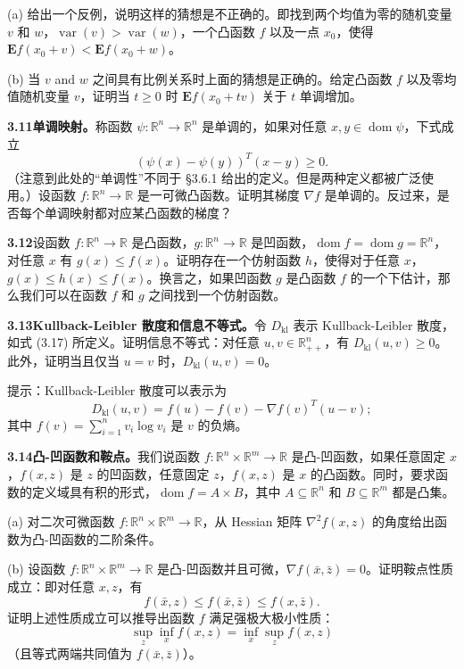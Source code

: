 \documentclass[UTF8, 12pt, fontset=fandol, oneside]{ctexart}
\DeclareMathOperator{\dom}{dom}
\begin{document}
(a) 给出一个反例，说明这样的猜想是不正确的。即找到两个均值为零的随机变量 $v$ 和 $w$，$\operatorname{var}(v)>\operatorname{var}(w)$，一个凸函数 $f$ 以及一点 $x_0$，使得 $\mathbf{E}f(x_0+v)<\mathbf{E}f(x_0+w)$。

(b) 当 $v$ and $w$ 之间具有比例关系时上面的猜想是正确的。给定凸函数 $f$ 以及零均值随机变量 $v$，证明当 $t\geq0$ 时 $\mathbf{E}f(x_0+tv)$ 关于 $t$ 单调增加。

\noindent\textbf{3.11\quad 单调映射。}\quad 称函数 $\psi:\mathbb{R}^n\to\mathbb{R}^n$ 是单调的，如果对任意 $x,y\in\dom\psi$，下式成立
\[
(\psi(x)-\psi(y))^T(x-y)\geq0.
\]
（注意到此处的“单调性”不同于 \S3.6.1 给出的定义。但是两种定义都被广泛使用。）设函数 $f:\mathbb{R}^n\to\mathbb{R}$ 是一可微凸函数。证明其梯度 $\nabla f$ 是单调的。反过来，是否每个单调映射都对应某凸函数的梯度？

\noindent\textbf{3.12}\quad 设函数 $f:\mathbb{R}^n\to\mathbb{R}$ 是凸函数，$g:\mathbb{R}^n\to\mathbb{R}$ 是凹函数，$\dom f=\dom g=\mathbb{R}^n$，对任意 $x$ 有 $g(x)\leq f(x)$。证明存在一个仿射函数 $h$，使得对于任意 $x$，$g(x)\leq h(x)\leq f(x)$。换言之，如果凹函数 $g$ 是凸函数 $f$ 的一个下估计，那么我们可以在函数 $f$ 和 $g$ 之间找到一个仿射函数。

\noindent\textbf{3.13\quad Kullback-Leibler 散度和信息不等式。}\quad 令 $D_{\mathrm{kl}}$ 表示 Kullback-Leibler 散度，如式 (3.17) 所定义。证明信息不等式：对任意 $u,v\in\mathbb{R}_{++}^n$，有 $D_{\mathrm{kl}}(u,v)\geq0$。此外，证明当且仅当 $u=v$ 时，$D_{\mathrm{kl}}(u,v)=0$。

提示：Kullback-Leibler 散度可以表示为
\[
D_{\mathrm{kl}}(u,v)=f(u)-f(v)-\nabla f(v)^T(u-v);
\]
其中 $f(v)=\sum_{i=1}^n v_i\log v_i$ 是 $v$ 的负熵。

\noindent\textbf{3.14\quad 凸-凹函数和鞍点。}\quad 我们说函数 $f:\mathbb{R}^n\times\mathbb{R}^m\to\mathbb{R}$ 是凸-凹函数，如果任意固定 $x$，$f(x,z)$ 是 $z$ 的凹函数，任意固定 $z$，$f(x,z)$ 是 $x$ 的凸函数。同时，要求函数的定义域具有积的形式，$\dom f=A\times B$，其中 $A\subseteq\mathbb{R}^n$ 和 $B\subseteq\mathbb{R}^m$ 都是凸集。

(a) 对二次可微函数 $f:\mathbb{R}^n\times\mathbb{R}^m\to\mathbb{R}$，从 Hessian 矩阵 $\nabla^2 f(x,z)$ 的角度给出函数为凸-凹函数的二阶条件。

(b) 设函数 $f:\mathbb{R}^n\times\mathbb{R}^m\to\mathbb{R}$ 是凸-凹函数并且可微，$\nabla f(\bar x,\bar z)=0$。证明鞍点性质成立：即对任意 $x,z$，有
\[
f(\bar x,z)\leq f(\bar x,\bar z)\leq f(x,\bar z).
\]
证明上述性质成立可以推导出函数 $f$ 满足强极大极小性质：
\[
\sup_z\inf_x f(x,z)=\inf_x\sup_z f(x,z)
\]
（且等式两端共同值为 $f(\bar x,\bar z)$）。
\end{document}
